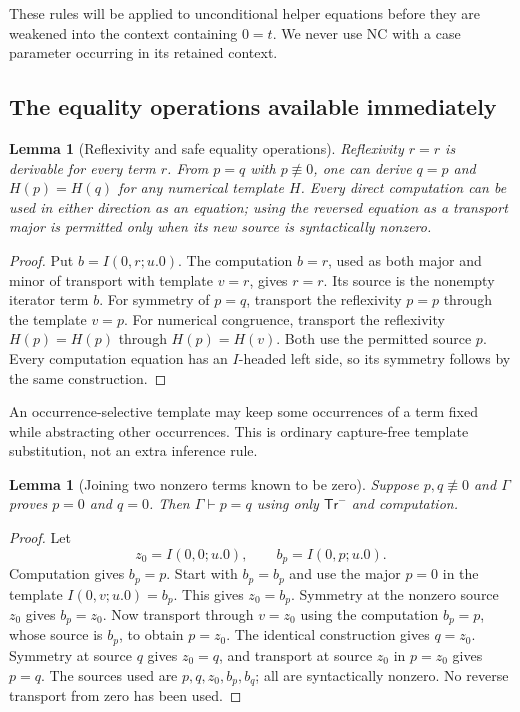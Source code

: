\documentclass[11pt,letterpaper]{article}
\newtheorem{lemma}[theorem]{Lemma}
\theoremstyle{definition}
\theoremstyle{remark}
\begin{document}
These rules will be applied to unconditional helper equations before
they are weakened into the context containing $0=t$. We never use NC
with a case parameter occurring in its retained context.

\subsection{The equality operations available immediately}

\begin{lemma}[Reflexivity and safe equality operations]
\label{zs:safe-equality}
Reflexivity $r=r$ is derivable for every term $r$. From $p=q$ with
$p\not\equiv0$, one can derive $q=p$ and $H(p)=H(q)$ for any numerical
template $H$. Every direct computation can be used in either direction
as an equation; using the reversed equation as a transport major is
permitted only when its new source is syntactically nonzero.
\end{lemma}
\begin{proof}
Put $b=I(0,r;u.0)$. The computation $b=r$, used as both major and
minor of transport with template $v=r$, gives $r=r$. Its source is
the nonempty iterator term $b$.
For symmetry of $p=q$, transport the reflexivity $p=p$ through the
template $v=p$. For numerical congruence, transport the reflexivity
$H(p)=H(p)$ through $H(p)=H(v)$. Both use the permitted source $p$.
Every computation equation has an $I$-headed left side, so its
symmetry follows by the same construction.
\end{proof}

An occurrence-selective template may keep some occurrences of a term
fixed while abstracting other occurrences. This is ordinary
capture-free template substitution, not an extra inference rule.

\begin{lemma}[Joining two nonzero terms known to be zero]
\label{zs:zero-join}
Suppose $p,q\not\equiv0$ and $\Gamma$ proves $p=0$ and $q=0$.
Then $\Gamma\vdash p=q$ using only $\mathsf{Tr}^{-}$ and computation.
\end{lemma}
\begin{proof}
Let
\[
 z_0=I(0,0;u.0),\qquad b_p=I(0,p;u.0).
\]
Computation gives $b_p=p$. Start with $b_p=b_p$ and use the major
$p=0$ in the template $I(0,v;u.0)=b_p$. This gives $z_0=b_p$.
Symmetry at the nonzero source $z_0$ gives $b_p=z_0$.
Now transport through $v=z_0$ using the computation $b_p=p$, whose
source is $b_p$, to obtain $p=z_0$.
The identical construction gives $q=z_0$. Symmetry at source $q$
gives $z_0=q$, and transport at source $z_0$ in $p=z_0$ gives $p=q$.
The sources used are $p,q,z_0,b_p,b_q$; all are syntactically nonzero.
No reverse transport from zero has been used.
\end{proof}
\end{document}
